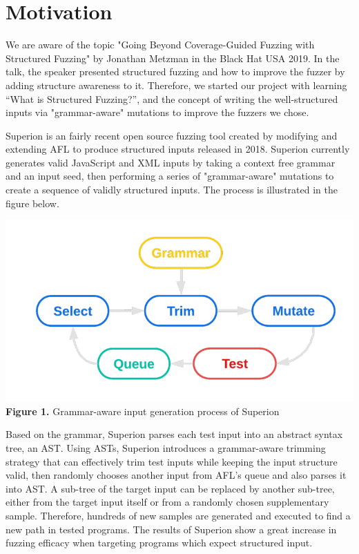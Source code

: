\documentclass[12pt]{diazessay}
\begin{document}
\section*{Motivation}
\label{Motivation}

We are aware of the topic "Going Beyond Coverage-Guided Fuzzing with Structured Fuzzing" by Jonathan Metzman in the Black Hat USA 2019\cite{blackhat2019}.
In the talk, the speaker presented structured fuzzing and how to improve the fuzzer by adding structure awareness to it. 
Therefore, we started our project with learning “What is Structured Fuzzing?”, and the concept of writing the well-structured inputs via "grammar-aware" mutations to improve the fuzzers we chose.

Superion\cite{superion} is an fairly recent open source fuzzing tool created by modifying and extending AFL to produce structured inputs released in 2018.
Superion currently generates valid JavaScript and XML inputs by taking a context free grammar and an input seed, then performing a series of "grammar-aware" mutations to create a sequence of validly structured inputs. The process is illustrated in the figure below.

\begin{center}
	\includegraphics[scale=0.4, trim={0 1cm 0 0}, clip]{superionfig.png}\\
	\textbf{Figure 1.} Grammar-aware input generation process of Superion
\end{center}
\vspace{3mm}

Based on the grammar, Superion parses each test input into an abstract syntax tree, an AST. Using ASTs, Superion introduces a grammar-aware trimming strategy that can effectively trim test inputs while keeping the input structure valid, then randomly chooses another input from AFL’s queue and also parses it into AST. A sub-tree of the target input can be replaced by another sub-tree, either from the target input itself or from a randomly chosen supplementary sample. Therefore, hundreds of new samples are generated and executed to find a new path in tested programs. The results of Superion show a great increase in fuzzing efficacy when targeting programs which expect structured input.
\end{document}
